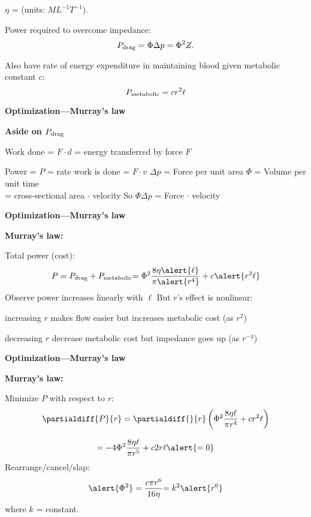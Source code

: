           
      $\eta$ = 
      (units: $ML^{-1}T^{-1}$).
     
      Power required to overcome impedance: 
      $$ P_{\textnormal{drag}} = \Phi \Delta p  = \Phi^2 Z. $$
     
      Also have rate of energy expenditure in maintaining blood
      given metabolic constant $c$:
      $$ P_{\textnormal{metabolic}} = c r^2 \ell  $$
    


  \textbf{Optimization---Murray's law}

  \textbf{Aside on $P_{\textnormal{drag}}$}
  
   
    Work done = $F \cdot d$ = energy transferred by force $F$
   
    Power = $P$ = rate work is done = $F \cdot v$
   $\Delta p$ = Force per unit area
   $\Phi$ = Volume per unit time \\ = cross-sectional area $\cdot$ velocity
   So $\Phi \Delta p$ = Force $\cdot$ velocity
  
  



  \textbf{Optimization---Murray's law}

  \textbf{Murray's law:}
    
     Total power (cost):
      $$ 
      P = P_{\textnormal{drag}} + P_{\textnormal{metabolic}}
      {=
      \Phi^2 \frac{8\eta \alert{\ell}}{\pi \alert{r^4}}
      + c \alert{r^2 \ell}}
      $$
     Observe power increases linearly with $\ell$
     But $r$'s effect is nonlinear: 
      
        
        increasing $r$
        makes flow easier \alert{but increases metabolic cost} (as $r^2$)
      
        decreasing $r$
        decrease metabolic cost \alert{but impedance goes up} (as $r^{-4}$)
      
    
  



  \textbf{Optimization---Murray's law}

  \textbf{Murray's law:}
    
     Minimize $P$ with respect to $r$:
      $$
      \partialdiff{P}{r}
      = 
      \partialdiff{}{r} 
      \left( 
        \Phi^2 \frac{8\eta {\ell}}{\pi {r^4}}
      + c {r^2 \ell}
      \right)
    $$
      {
        $$
        = 
        -4 \Phi^2 \frac{8\eta {\ell}}{\pi {r^5}}
        + c {2r \ell}
        {\alert{=0}}
      $$
       Rearrange/cancel/slap:
        $$
        \alert{\Phi^2} = \frac{c \pi r^6}{16 \eta} {= k^2 \alert{r^6}}
        $$
        {where $k$ = constant.}
        
      }
    
